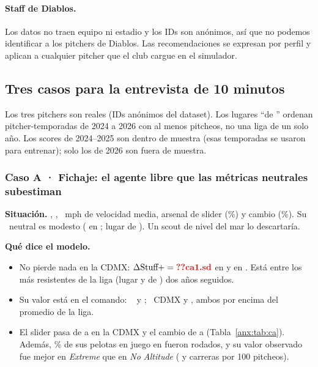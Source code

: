 \paragraph{Staff de Diablos.} Los datos no traen equipo ni estadio y los IDs son anónimos, así que no podemos identificar a los pitchers de Diablos. Las recomendaciones se expresan por perfil y aplican a cualquier pitcher que el club cargue en el simulador.

\subsection{Tres casos para la entrevista de 10 minutos}

Los tres pitchers son reales (IDs anónimos del dataset). Los lugares ``de '' ordenan pitcher-temporadas de 2024 a 2026 con al menos  pitcheos, no una liga de un solo año. Los scores de 2024--2025 son dentro de muestra (esas temporadas se usaron para entrenar); solo los de 2026 son fuera de muestra.

\subsubsection{Caso A · Fichaje: el agente libre que las métricas neutrales subestiman}

\textbf{Situación.} , , ~mph de velocidad media, arsenal de slider (\%) y cambio (\%). Su \splus\ neutral es modesto ( en ; lugar  de ). Un scout de nivel del mar lo descartaría.

\textbf{Qué dice el modelo.}
\begin{itemize}
  \item No pierde nada en la CDMX: $\Delta\splus = \cf{ca1.sd}$ en  y  en . Está entre los más resistentes de la liga (lugar  y  de ) dos años seguidos.
  \item Su valor está en el comando: \lplus\  y ; \pplus\ CDMX  y , ambos por encima del promedio de la liga.
  \item El slider pasa de  a  en la CDMX y el cambio de  a  (Tabla~\ref{anx:tab:ca}). Además, \% de sus pelotas en juego en  fueron rodados, y su valor observado fue mejor en \emph{Extreme} que en \emph{No Altitude} ( y  carreras por 100 pitcheos).
\end{itemize}

